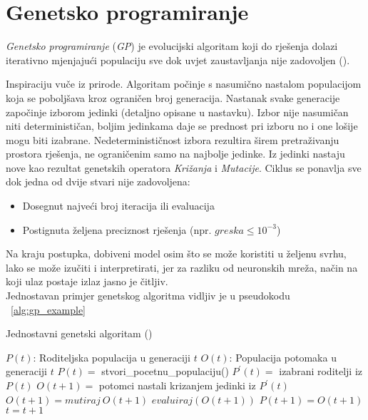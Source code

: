 \section{Genetsko programiranje}
\emph{Genetsko programiranje} (\emph{GP}) je evolucijski algoritam koji do rješenja dolazi iterativno mjenjajući populaciju sve dok uvjet zaustavljanja nije zadovoljen (\cite{conv_gen_programming}).

Inspiraciju vuče iz prirode.
Algoritam počinje s nasumično nastalom populacijom koja se poboljšava kroz ograničen broj generacija.
Nastanak svake generacije započinje izborom jedinki (detaljno opisane u nastavku).
Izbor nije nasumičan niti determinističan, boljim jedinkama daje se prednost pri izboru no i one lošije mogu biti izabrane.
Nedeterminističnost izbora rezultira širem pretraživanju prostora rješenja, ne ograničenim samo na najbolje jedinke.
Iz jedinki nastaju nove kao rezultat genetskih operatora \emph{Križanja} i \emph{Mutacije}.
Ciklus se ponavlja sve dok jedna od dvije stvari nije zadovoljena:
\begin{itemize}
	\item{Dosegnut najveći broj iteracija ili evaluacija}
	\item{Postignuta željena preciznost rješenja (npr. $greska \leq 10^{-3}$})
\end{itemize}
Na kraju postupka, dobiveni model osim što se može koristiti u željenu svrhu, lako se može izučiti i interpretirati, jer za razliku od neuronskih mreža, način na koji ulaz postaje izlaz jasno je čitljiv. \\
Jednostavan primjer genetskog algoritma vidljiv je u pseudokodu ~\ref{alg:gp_example}

\begin{algorithm}
	\caption{Jednostavni genetski algoritam (\cite{wong2015evolutionary})}
	\label{alg:gp_example}
	\begin{algorithmic}
		\STATE $P(t)$: Roditeljska populacija u generaciji $t$
		\STATE $O(t)$: Populacija potomaka u generaciji $t$
		\STATE $P(t)=$ stvori\_pocetnu\_populaciju()
			\STATE $P^{'}(t) =$ izabrani roditelji iz $P(t)$
			\STATE $O(t + 1) =$ potomci nastali krizanjem jedinki iz $P^{'}(t)$
			\STATE $O(t + 1) = mutiraj\ O(t + 1)$
			\STATE $evaluiraj(O(t + 1))$
			\STATE $P(t + 1) = O(t + 1)$
			\STATE $t = t + 1$
		\ENDWHILE
	\end{algorithmic}
\end{algorithm}

